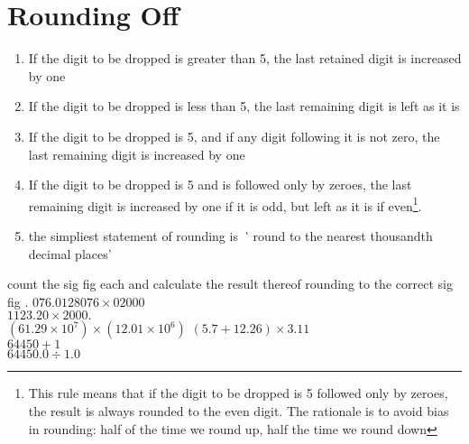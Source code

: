 \documentclass[a4paper]{tufte-handout}
\newenvironment{TaskBox} %
{\begin{tcolorbox}[breakable,colback=b1!30,colframe=b1,title=Task]} {\end{tcolorbox}}
\begin{document}
\section{Rounding Off}
\begin{enumerate}
	\item If the digit to be dropped is greater than 5, the last retained digit is increased by one
	\item If the digit to be dropped is less than 5, the last remaining digit is left as it is
	\item If the digit to be dropped is 5, and if any digit following it is not zero, the last remaining digit is increased by one
	\item If the digit to be dropped is 5 and is followed only by zeroes, the last remaining digit is increased by one if it is odd, but left as it is if even\footnote{This rule means that if the digit to be dropped is 5 followed only by zeroes, the result is always rounded to the even digit. The rationale is to avoid bias in rounding: half of the time we round up, half the time we round down}.
	\item the simpliest statement of rounding is \emph` round to the nearest thousandth decimal places'
\end{enumerate}

\begin{TaskBox}
count the sig fig each and calculate the result thereof rounding to the correct sig fig .
\tcblower
$076.0128076 \times 02000$\\
$1123.20 \times 2000.$\\
$(61.29 \times 10^7) \times (12.01 \times 10^6)$
$(5.7 + 12.26) \times 3.11$\\
$64450 + 1$\\
$64450.0 \div 1.0$\\
\end{TaskBox}
\end{document}
